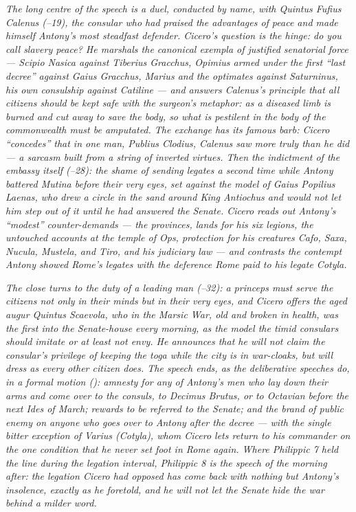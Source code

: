 \textit{The long centre of the speech is a duel, conducted by
name, with Quintus Fufius Calenus (--19), the
consular who had praised the advantages of peace and made himself
Antony's most steadfast defender. Cicero's question is the hinge:
do you call slavery peace? He marshals the canonical exempla of
justified senatorial force --- Scipio Nasica against Tiberius
Gracchus, Opimius armed under the first ``last decree'' against
Gaius Gracchus, Marius and the \textit{optimates} against
Saturninus, his own consulship against Catiline --- and answers
Calenus's principle that all citizens should be kept safe with the
surgeon's metaphor: as a diseased limb is burned and cut away to
save the body, so what is pestilent in the body of the
commonwealth must be amputated. The exchange has its famous barb:
Cicero ``concedes'' that in one man, Publius Clodius, Calenus saw
more truly than he did --- a sarcasm built from a string of
inverted virtues. Then the indictment of the embassy itself
(--28): the shame of sending legates a second time
while Antony battered Mutina before their very eyes, set against
the model of Gaius Popilius Laenas, who drew a circle in the sand
around King Antiochus and would not let him step out of it until
he had answered the Senate. Cicero reads out Antony's ``modest''
counter-demands --- the provinces, lands for his six legions, the
untouched accounts at the temple of Ops, protection for his
creatures Cafo, Saxa, Nucula, Mustela, and Tiro, and his judiciary
law --- and contrasts the contempt Antony showed Rome's legates
with the deference Rome paid to his legate Cotyla.}

\textit{The close turns to the duty of a leading man
(--32): a princeps must serve the citizens not
only in their minds but in their very eyes, and Cicero offers the
aged augur Quintus Scaevola, who in the Marsic War, old and
broken in health, was the first into the Senate-house every
morning, as the model the timid consulars should imitate or at
least not envy. He announces that he will not claim the consular's
privilege of keeping the toga while the city is in war-cloaks, but
will dress as every other citizen does. The speech ends, as the
deliberative speeches do, in a formal motion ():
amnesty for any of Antony's men who lay down their arms and come
over to the consuls, to Decimus Brutus, or to Octavian before the
next Ides of March; rewards to be referred to the Senate; and the
brand of public enemy on anyone who goes over to Antony after the
decree --- with the single bitter exception of Varius (Cotyla),
whom Cicero lets return to his commander on the one condition that
he never set foot in Rome again. Where Philippic 7 held the line
during the legation interval, Philippic 8 is the speech of the
morning after: the legation Cicero had opposed has come back with
nothing but Antony's insolence, exactly as he foretold, and he
will not let the Senate hide the war behind a milder word.}
